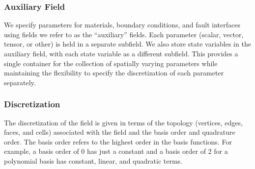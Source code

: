 \subsubsection{Auxiliary Field}

We specify parameters for materials, boundary conditions, and fault
interfaces using fields we refer to as the ``auxiliary'' fields.  Each
parameter (scalar, vector, tensor, or other) is held in a separate
subfield. We also store state variables in the auxiliary field, with
each state variable as a different subfield. This provides a single
container for the collection of spatially varying parameters while
maintaining the flexibility to specify the discretization of each
parameter separately. 

\subsubsection{Discretization}

The discretization of the field is given in terms of the topology
(vertices, edges, faces, and cells) associated with the field and the
basis order and quadrature order. The basis order refers to the
highest order in the basis functions. For example, a basis order of 0
has just a constant and a basis order of 2 for a polynomial basis has
constant, linear, and quadratic terms.



